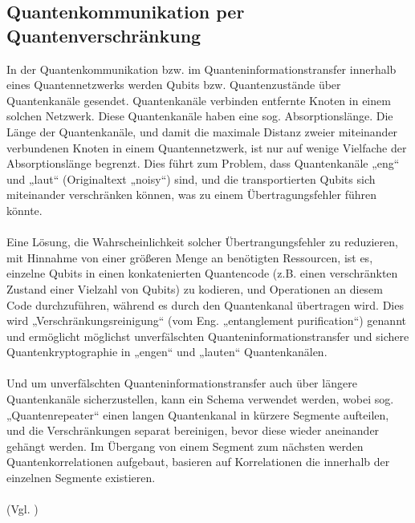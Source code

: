 \subsection{Quantenkommunikation per Quantenverschränkung}
In der Quantenkommunikation bzw. im Quanteninformationstransfer innerhalb eines Quantennetzwerks werden Qubits bzw. Quantenzustände über Quantenkanäle gesendet. Quantenkanäle verbinden entfernte Knoten in einem solchen Netzwerk. Diese Quantenkanäle haben eine sog. Absorptionslänge. Die Länge der Quantenkanäle, und damit die maximale Distanz zweier miteinander verbundenen Knoten in einem Quantennetzwerk, ist nur auf wenige Vielfache der Absorptionslänge begrenzt. Dies führt zum Problem, dass Quantenkanäle „eng“ und „laut“ (Originaltext „noisy“) sind, und die transportierten Qubits sich miteinander verschränken können, was zu einem Übertragungsfehler führen könnte.\\
\\
Eine Lösung, die Wahrscheinlichkeit solcher Übertrangungsfehler zu reduzieren, mit Hinnahme von einer größeren Menge an benötigten Ressourcen, ist es, einzelne Qubits in einen konkatenierten Quantencode (z.B. einen verschränkten Zustand einer Vielzahl von Qubits) zu kodieren, und Operationen an diesem Code durchzuführen, während es durch den Quantenkanal übertragen wird. Dies wird „Verschränkungsreinigung“ (vom Eng. „entanglement purification“) genannt und ermöglicht möglichst unverfälschten Quanteninformationstransfer und sichere Quantenkryptographie in „engen“ und „lauten“ Quantenkanälen.\\
\\
Und um unverfälschten Quanteninformationstransfer auch über längere Quantenkanäle sicherzustellen, kann ein Schema verwendet werden, wobei sog. „Quantenrepeater“ einen langen Quantenkanal in kürzere Segmente aufteilen, und die Verschränkungen separat bereinigen, bevor diese wieder aneinander gehängt werden. Im Übergang von einem Segment zum nächsten werden Quantenkorrelationen aufgebaut, basieren auf Korrelationen die innerhalb der einzelnen Segmente existieren.\\
\\
(Vgl. \cite[S.1-2]{dur_quantum_1999})

